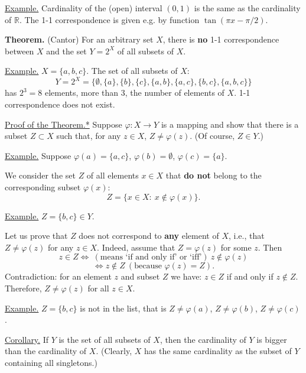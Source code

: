 \documentclass[a4paper,10pt]{article}
\def\RR{\mathbb{R}}
\newcommand{\1}[1]{\mathbf{1}_{\{#1\}}}
\begin{document}
\underline{Example.} Cardinality of the (open) interval $(0,1)$ is the same as the cardinality of $\RR$. The 1-1 correspondence is given e.g. by function $\tan(\pi x-\pi/2)$. \vspace{3cm}

{\bf Theorem.} (Cantor) For an arbitrary set $X$, there is {\bf no} 1-1 correspondence between $X$ and the set $Y=2^X$ of all subsets of $X$. \vspace{3mm}

\underline{Example.} $X=\{a,b,c\}$. The set of all subsets of $X$:
  $$Y=2^X=\{\emptyset, \{a\}, \{b\}, \{c\}, \{a,b\}, \{a,c\}, \{b,c\},\{a,b,c\}\}$$
has $2^3=8$ elements, more than 3, the number of elements of $X$. 1-1 correspondence does not exist.\vspace{3mm}

\underline{Proof of the Theorem.*} Suppose $\varphi:X\to Y$ is a mapping and show that there is a subset $Z\subset X$ such that, for any $z\in X$, $Z\ne\varphi(z)$. (Of course, $Z\in Y$.)  \vspace{3mm}

\underline{Example.} Suppose $\varphi(a)=\{a,c\}$, $\varphi(b)=\emptyset$, $\varphi(c)=\{a\}$. \vspace{3mm}

We consider the set $Z$ of all elements $x\in X$ that {\bf do not} belong to the corresponding subset $\varphi(x)$:
  $$Z=\{x\in X:~x\notin \varphi(x)\}.$$  \vspace{3mm}

\underline{Example.} $Z=\{b,c\}\in Y$. \vspace{3mm}

Let us prove that $Z$ does not correspond to {\bf any} element of $X$, i.e., that $Z\ne\varphi(z)$ for any $z\in X$. Indeed, assume that $Z=\varphi(z)$ for some $z$. Then
  $$z\in Z \Longleftrightarrow~ (\mbox {means `if and only if' or `iff'})~ z\notin \varphi(z)$$
  $$\Longleftrightarrow z\notin Z ~(\mbox{because } \varphi(z)=Z).$$
Contradiction: for an element $z$ and subset $Z$ we have: $z\in Z$ if and only if $z\notin Z$. Therefore, $Z\ne\varphi(z)$ for all $z\in X$.  \blacksquare
\vspace{3mm}

\underline{Example.} $Z=\{b,c\}$ is not in the list, that is $Z\ne\varphi(a)$, $Z\ne\varphi(b)$, $Z\ne\varphi(c)$. \vspace{3mm}

\underline{Corollary.} If $Y$ is the set of all subsets of $X$, then the cardinality of $Y$ is bigger than the cardinality of $X$. (Clearly, $X$ has the same cardinality as the subset of $Y$ containing all singletons.)\vspace{3mm}
\end{document}

